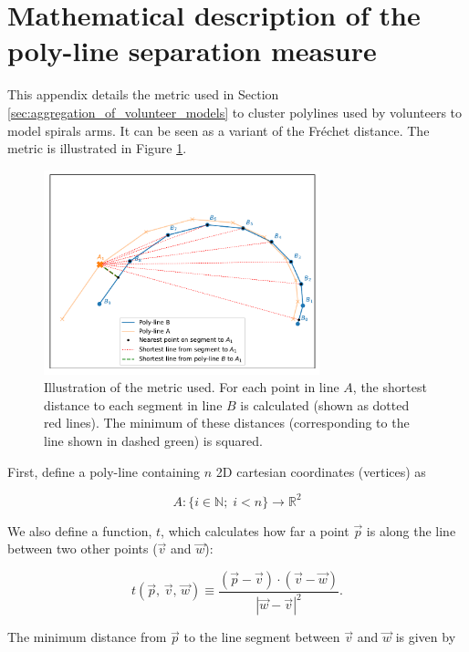 \documentclass[../main.tex]{subfiles}
\begin{document}
\section{Mathematical description of the poly-line separation measure}
\label{appendix:clustering_maths}

This appendix details the metric used in Section \ref{sec:aggregation_of_volunteer_models} to cluster poly\-lines used by volunteers to model spirals arms. It can be seen as a variant of the Fréchet distance. The metric is illustrated in Figure \ref{fig:spiral_metric_description}.

\begin{figure}
  \includegraphics[width=8cm]{images__appendix/spiral_metric_description.pdf}
  \caption{Illustration of the metric used. For each point in line $A$, the shortest distance to each segment in line $B$ is calculated (shown as dotted red lines). The minimum of these distances (corresponding to the line shown in dashed green) is squared.}
  \label{fig:spiral_metric_description}
\end{figure}

First, define a poly-line containing $n$ 2D cartesian coordinates (vertices) as

\begin{equation}
A: \{i \in \mathbb{N};\;i<n\} \longrightarrow \mathbb{R}
^2\end{equation}

We also define a function, $t$, which calculates how far a point $\vec{p}$ is along the line between two other points ($\vec{v}$ and $\vec{w}$):

\begin{equation}
t(\vec{p},\,\vec{v},\,\vec{w}) \equiv \frac{(\vec{p} - \vec{v})\cdot(\vec{v} - \vec{w})}{|\vec{w} - \vec{v}|^2}.
\end{equation}

The minimum distance from $\vec{p}$ to the line segment between $\vec{v}$ and $\vec{w}$ is given by
\end{document}

